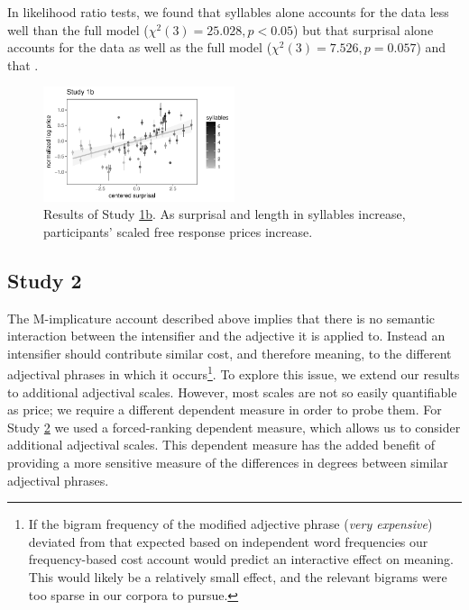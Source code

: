 \documentclass[10pt,letterpaper]{article}
\newcommand{\w}[1]{\emph{#1}}
\begin{document}
In likelihood ratio tests, we found that syllables alone accounts for the data less well than the full model ($\chi^2(3)=25.028,p<0.05$) but that surprisal alone accounts for the data as well as the full model ($\chi^2(3)=7.526,p=0.057$) and that .

\begin{figure}[ht]
\begin{center}
\includegraphics[width=0.5\textwidth]{images/plot_study1b.pdf}
\end{center}
\caption{Results of Study \hyperref[sec:study1b]{1b}. As surprisal and length in syllables increase, participants' scaled free response prices increase.} 
\label{fig:plot_study1b}
\end{figure}

\subsection{Study 2 \label{sec:study2}}

The M-implicature account described above implies that there is no semantic interaction between the intensifier and the adjective it is applied to.
Instead an intensifier should contribute similar cost, and therefore meaning, to the different adjectival phrases in which it occurs\footnote{If the bigram frequency of the modified adjective phrase (\w{very expensive}) deviated from that expected based on independent word frequencies our frequency-based cost account would predict an interactive effect on meaning.
This would likely be a relatively small effect, and the relevant bigrams were too sparse in our corpora to pursue.}.
To explore this issue, we extend our results to additional adjectival scales.
However, most scales are not so easily quantifiable as price; we require a different dependent measure in order to probe them.
For Study \hyperref[sec:study2]{2} we used a forced-ranking dependent measure, which allows us to consider additional adjectival scales.
This dependent measure has the added benefit of providing a more sensitive measure of the differences in degrees between similar adjectival phrases.
\end{document}
